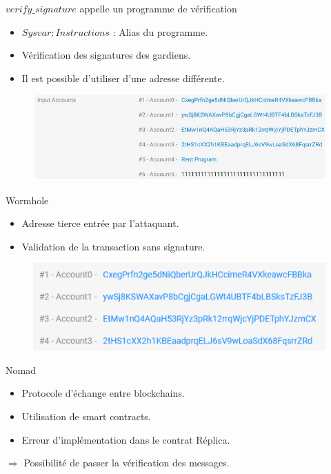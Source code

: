 \begin{frame}
    \begin{block}{$verify\_signature$ appelle un programme de vérification}
        \begin{itemize}
            \item $Sysvar: Instructions$ : Alias du programme.
            \item Vérification des signatures des gardiens.
            \item Il est possible d'utiliser d'une adresse différente.
        \end{itemize}  
    \end{block}
    \begin{figure}
        \centering
        \includegraphics[scale = 0.3]{img/wormhole_img1.png}
    \end{figure}
\end{frame}

\begin{frame}{Wormhole}
    \begin{itemize}
        \item Adresse tierce entrée par l'attaquant.
        \item Validation de la transaction sans signature.
    \end{itemize}
        \begin{figure}
        \centering
        \includegraphics[scale = 0.7]{img/wormhole_img2.png}
    \end{figure}
\end{frame}



\begin{frame}{Nomad}
    \begin{itemize}
        \item Protocole d'échange entre blockchains.
        \item Utilisation de smart contracts.
        \item Erreur d'implémentation dans le contrat Réplica.
    \end{itemize}
    $\Rightarrow$ Possibilité de passer la vérification des messages.
\end{frame}

